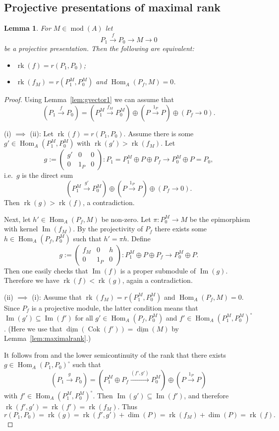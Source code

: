 \documentclass[12pt,reqno]{amsart}
\newtheorem{Lem}[Thm]{Lemma}
\theoremstyle{definition}
\newcommand{\df}{\colon}
\newcommand{\rk}{\operatorname{rk}}
\newcommand{\md}{\operatorname{mod}}
\newcommand{\dimv}{\underline{\dim}}
\newcommand{\Hom}{\operatorname{Hom}}
\newcommand{\Ima}{\operatorname{Im}}
\newcommand{\Coker}{\operatorname{Cok}}
\newcommand{\bbm}{\begin{matrix}}
\newcommand{\ebm}{\end{matrix}}
\begin{document}
\subsection{Projective presentations of maximal rank}


\begin{Lem}\label{lem:maxrankfM}
For $M \in \md(A)$ let
$$
P_1 \xrightarrow{f} P_0 \to M \to 0
$$
be a projective presentation.
Then the following are equivalent:
\begin{itemize}\itemsep2mm

\item[(i)]
$\rk(f) = r(P_1,P_0)$;

\item[(ii)]
$\rk(f_M) = r(P_1^M,P_0^M)$ and
$\Hom_A(P_f,M) = 0$.

\end{itemize}
\end{Lem}


\begin{proof}
Using Lemma~\ref{lem:gvector1} we can assume that
$$
(P_1 \xrightarrow{f} P_0) =
(P_1^M \xrightarrow{f_M} P_0^M) \oplus
(P \xrightarrow{1_P} P) \oplus
(P_f \to 0).
$$

(i) $\implies$ (ii):
Let $\rk(f) = r(P_1,P_0)$.
Assume there is some $g' \in \Hom_A (P_1^M, P_0^M)$
with $\rk(g') > \rk(f_M)$.
Let
$$
g :=
\left(
\bbm
g' & 0 & 0 \\ 0 & 1_P & 0
\ebm\right)\df P_1 = P_1^M \oplus P \oplus P_f \to
P_0^M \oplus P = P_0,
$$
i.e.\ $g$ is the direct sum
$$
(P_1^M \xrightarrow{g'} P_0^M) \oplus (P \xrightarrow{1_P} P) \oplus (P_f \to 0).
$$
Then $\rk(g) > \rk(f)$, a contradiction.

Next, let $h' \in \Hom_A (P_f,M)$ be non-zero.
Let $\pi \colon P_0^M \to M$ be the epimorphism with kernel
$\Ima(f_M)$.
By the projectivity of $P_f$ there exists some
$h \in \Hom_A(P_f,P_0^M)$ such that $h' = \pi h$.
Define
$$
g :=
\left(
\bbm
f_M & 0 & h \\ 0 & 1_P & 0
\ebm\right)\df P_1^M \oplus P \oplus P_f \to
P_0^M \oplus P.
$$
Then one easily checks that $\Ima(f)$ is a proper submodule of $\Ima(g)$.
Therefore we have $\rk(f)<\rk(g)$, again a contradiction.


(ii) $\implies$ (i):
Assume that $\rk(f_M) = r(P_1^M,P_0^M)$ and
$\Hom_A(P_f,M) = 0$.
Since $P_f$ is a projective module, the latter condition means that
$\Ima(g') \subseteq \Ima(f')$ for all $g'\in \Hom_A(P_f,P_0^M)$ and
$f' \in \Hom_A(P_1^M,P_0^M)^\circ$.
(Here we use that $\dimv (\Coker (f')) = \dimv (M)$ by Lemma~\ref{lem:maximalrank}.)

It follows from \cite[Corollary~4.2]{DF15} and the lower semicontinuity of the rank that there exists
$g \in \Hom_A(P_1,P_0)^\circ$ such that
$$
(P_1 \xrightarrow{g} P_0) =
(P_1^M \oplus P_f \xrightarrow{(f',g')} P_0^M)
\oplus (P \xrightarrow{1_P} P)
$$
with $f' \in \Hom_A (P_1^M,P_0^M)^\circ$.
Then $\Ima(g') \subseteq \Ima(f')$, and therefore
$\rk(f',g') = \rk (f') = \rk (f_M)$.
Thus
$$
r(P_1,P_0) = \rk(g) = \rk(f',g') + \dim(P)
= \rk(f_M) + \dim(P) = \rk(f).
$$
\end{proof}
\end{document}
